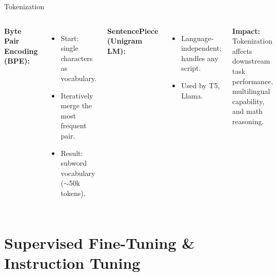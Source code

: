 \documentclass[aspectratio=169,10pt]{beamer}
\begin{document}
\begin{frame}{Tokenization}
  \begin{columns}[T]
      \textbf{Byte Pair Encoding (BPE):}
      \begin{itemize}
        \item Start: single characters as vocabulary.
        \item Iteratively merge the most frequent pair.
        \item Result: subword vocabulary ($\sim$50k tokens).
      \end{itemize}
      \vspace{0.4em}
      \textbf{SentencePiece (Unigram LM):}
      \begin{itemize}
        \item Language-independent; handles any script.
        \item Used by T5, Llama.
      \end{itemize}
      \vspace{0.4em}
      \textbf{Impact:} Tokenization affects downstream task performance, multilingual capability, and math reasoning.
  \end{columns}
\end{frame}

\section{Supervised Fine-Tuning \& Instruction Tuning}
\end{document}

